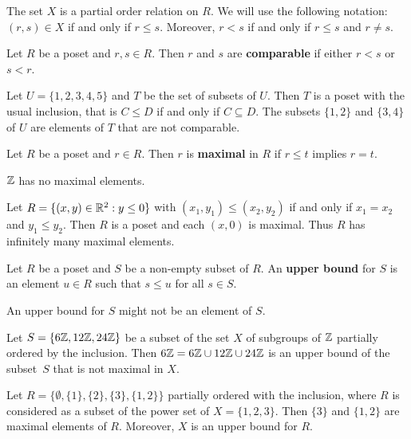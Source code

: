 The set $X$ is a partial order relation on $R$.  
We will use the following notation: $(r,s)\in X$ if and only if $r\leq s$. Moreover, 
$r<s$ if and only if $r\leq s$ and $r\ne s$. 

\begin{definition}
Let $R$ be a poset and $r,s\in R$. Then $r$ and $s$ are \textbf{comparable}
if either $r<s$ or $s<r$.
\end{definition}

\begin{example}
    Let $U=\{1,2,3,4,5\}$ and $T$ be the set of subsets of $U$. Then $T$ is a poset
    with the usual inclusion, that is $C\leq D$ if and only if $C\subseteq D$. The subsets
    $\{1,2\}$ and $\{3,4\}$ of $U$ are elements of $T$ that are not comparable. 
\end{example}

\begin{definition}
    Let $R$ be a poset and $r\in R$. Then $r$ is \textbf{maximal} in $R$ if 
    $r\leq t$ implies $r=t$. 
\end{definition}

\begin{example}
    $\mathbb{Z}$ has no maximal elements. 
\end{example}

\begin{example}
Let $R=\{(x,y)\in\mathbb{R}^2:y\leq0\}$ with $(x_1,y_1)\leq(x_2,y_2)$ if and only if $x_1=x_2$ and $y_1\leq y_2$. Then
$R$ is a poset and each $(x,0)$ is maximal. Thus $R$ has infinitely many maximal elements.
\end{example}

\begin{definition}
    Let $R$ be a poset and $S$ be a non-empty subset of $R$. An \textbf{upper bound}
    for $S$ is an element $u\in R$ such that $s\leq u$ for all $s\in S$. 
\end{definition}

An upper bound for $S$ might not be an element of $S$. 

\begin{example}
    Let $S=\{6\mathbb{Z},12\mathbb{Z},24\mathbb{Z}\}$ be a subset of the set $X$ 
    of subgroups of $\mathbb{Z}$ partially ordered by 
    the inclusion. Then 
    $6\mathbb{Z}=6\mathbb{Z}\cup 12\mathbb{Z}\cup 24\mathbb{Z}$ is an upper bound of the subset~$S$ 
    that is not maximal in $X$. 
\end{example}

\begin{example}
    Let $R=\{\emptyset, \{1\},\{2\},\{3\},\{1,2\}\}$ partially ordered with
    the inclusion, where $R$ is considered as a subset
    of the power set of $X=\{1,2,3\}$. 
    Then $\{3\}$ and $\{1,2\}$ are maximal elements of $R$. Moreover, 
    $X$ is an upper bound for $R$. 
\end{example}


